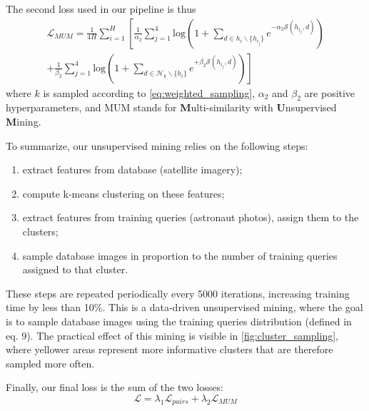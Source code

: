 The second loss used in our pipeline is thus
{\small
\begin{equation}
    \begin{split}
        \mathcal{L}_{MUM} = \frac{1}{4H}\sum_{i=1}^{H} \left[\frac{1}{\alpha_2} 
        \sum_{j=1}^4 \text{log} 
        \left( 1+ \sum_{d\in h_i\backslash\{h_{i_{j}}\}}e^{-\alpha_2\mathcal{S}(h_{{i}_j}, d)} \right) \right. \\ 
        + \left. \frac{1}{\beta_2} \sum_{j=1}^4 \text{log} \left( 1+ \sum_{d\in\mathcal{H}_k\backslash \{h_i\}}e^{+\beta_2 \mathcal{S}(h_{{i}_j}, d)} \right) \right]
    \end{split}
\end{equation}
}
where $k$ is sampled according to \cref{eq:weighted_sampling}, $\alpha_2$ and $\beta_2$ are positive hyperparameters, and MUM stands for \textbf{M}ulti-similarity with \textbf{U}nsupervised \textbf{M}ining.

To summarize, our unsupervised mining relies on the following steps:
\begin{enumerate}
    \item extract features from database (\ie satellite imagery);
    \item compute k-means clustering on these features;
    \item  extract features from training queries (\ie astronaut photos), assign them to the clusters;
    \item sample database images in proportion to the number of training queries assigned to that cluster.
\end{enumerate}
These steps are repeated periodically every 5000 iterations, increasing training time by less than 10\%.
This is a data-driven unsupervised mining, where the goal is to sample database images using the training queries distribution (defined in eq. 9).
The practical effect of this mining is visible in \cref{fig:cluster_sampling}, where yellower areas represent more informative clusters that are therefore sampled more often.


Finally, our final loss is the sum of the two losses:{\small
\begin{equation}
    \mathcal{L} = \lambda_{1} \mathcal{L}_{pairs} + \lambda_{2} \mathcal{L}_{MUM}
\end{equation}
}

